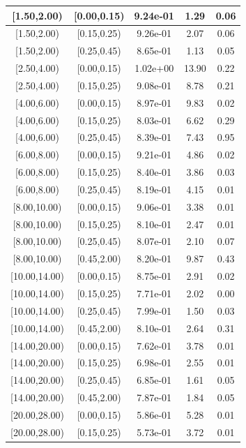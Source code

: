 \documentclass[%
aps, prd, reprint, show pacs, preprint numbers, ams math, amssymb, superscriptaddress, linenumbers]{revtex4-1}
\begin{document}
\begin{table}
\begin{tabular}{|c|c|c|c|c|}
 \hline
[1.50,2.00) & [0.00,0.15) & 9.24e-01 & 1.29 & 0.06 \\ 
 \hline
[1.50,2.00) & [0.15,0.25) & 9.26e-01 & 2.07 & 0.06 \\ 
 \hline
[1.50,2.00) & [0.25,0.45) & 8.65e-01 & 1.13 & 0.05 \\ 
 \hline
[2.50,4.00) & [0.00,0.15) & 1.02e+00 & 13.90 & 0.22 \\ 
 \hline
[2.50,4.00) & [0.15,0.25) & 9.08e-01 & 8.78 & 0.21 \\ 
 \hline
[4.00,6.00) & [0.00,0.15) & 8.97e-01 & 9.83 & 0.02 \\ 
 \hline
[4.00,6.00) & [0.15,0.25) & 8.03e-01 & 6.62 & 0.29 \\ 
 \hline
[4.00,6.00) & [0.25,0.45) & 8.39e-01 & 7.43 & 0.95 \\ 
 \hline
[6.00,8.00) & [0.00,0.15) & 9.21e-01 & 4.86 & 0.02 \\ 
 \hline
[6.00,8.00) & [0.15,0.25) & 8.40e-01 & 3.86 & 0.03 \\ 
 \hline
[6.00,8.00) & [0.25,0.45) & 8.19e-01 & 4.15 & 0.01 \\ 
 \hline
[8.00,10.00) & [0.00,0.15) & 9.06e-01 & 3.38 & 0.01 \\ 
 \hline
[8.00,10.00) & [0.15,0.25) & 8.10e-01 & 2.47 & 0.01 \\ 
 \hline
[8.00,10.00) & [0.25,0.45) & 8.07e-01 & 2.10 & 0.07 \\ 
 \hline
[8.00,10.00) & [0.45,2.00) & 8.20e-01 & 9.87 & 0.43 \\ 
 \hline
[10.00,14.00) & [0.00,0.15) & 8.75e-01 & 2.91 & 0.02 \\ 
 \hline
[10.00,14.00) & [0.15,0.25) & 7.71e-01 & 2.02 & 0.00 \\ 
 \hline
[10.00,14.00) & [0.25,0.45) & 7.99e-01 & 1.50 & 0.03 \\ 
 \hline
[10.00,14.00) & [0.45,2.00) & 8.10e-01 & 2.64 & 0.31 \\ 
 \hline
[14.00,20.00) & [0.00,0.15) & 7.62e-01 & 3.78 & 0.01 \\ 
 \hline
[14.00,20.00) & [0.15,0.25) & 6.98e-01 & 2.55 & 0.01 \\ 
 \hline
[14.00,20.00) & [0.25,0.45) & 6.85e-01 & 1.61 & 0.05 \\ 
 \hline
[14.00,20.00) & [0.45,2.00) & 7.87e-01 & 1.84 & 0.05 \\ 
 \hline
[20.00,28.00) & [0.00,0.15) & 5.86e-01 & 5.28 & 0.01 \\ 
 \hline
[20.00,28.00) & [0.15,0.25) & 5.73e-01 & 3.72 & 0.01 \\ 

\end{tabular}
\end{table}
\end{document}
